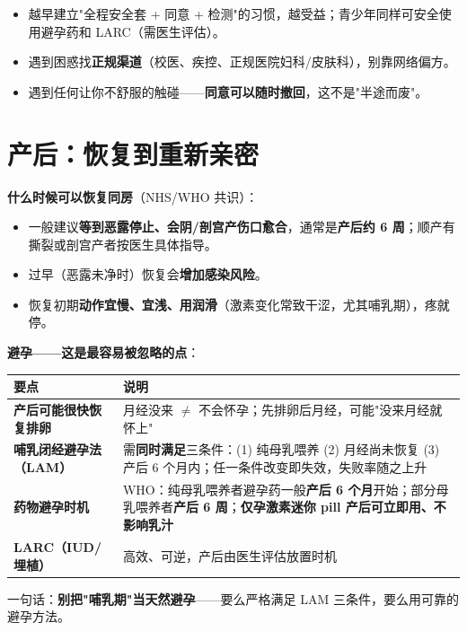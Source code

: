 \documentclass[12pt,UTF8,openany]{ctexbook}
\begin{document}
\begin{itemize}[leftmargin=2em,itemsep=0.3em]
  \item 越早建立"全程安全套 + 同意 + 检测"的习惯，越受益；青少年同样可安全使用避孕药和 LARC（需医生评估）。
  \item 遇到困惑找\textbf{正规渠道}（校医、疾控、正规医院妇科/皮肤科），别靠网络偏方。
  \item 遇到任何让你不舒服的触碰——\textbf{同意可以随时撤回}，这不是"半途而废"。
\end{itemize}

\section{产后：恢复到重新亲密}

\textbf{什么时候可以恢复同房}（NHS/WHO 共识）：

\begin{itemize}[leftmargin=2em,itemsep=0.3em]
  \item 一般建议\textbf{等到恶露停止、会阴/剖宫产伤口愈合}，通常是\textbf{产后约 6 周}；顺产有撕裂或剖宫产者按医生具体指导。
  \item 过早（恶露未净时）恢复会\textbf{增加感染风险}。
  \item 恢复初期\textbf{动作宜慢、宜浅、用润滑}（激素变化常致干涩，尤其哺乳期），疼就停。
\end{itemize}

\textbf{避孕——这是最容易被忽略的点}：

\begin{tabularx}{\linewidth}{X X}
\toprule
\textbf{要点} & \textbf{说明} \\
\midrule
\textbf{产后可能很快恢复排卵} & 月经没来 $\ne$ 不会怀孕；先排卵后月经，可能"没来月经就怀上" \\
\textbf{哺乳闭经避孕法（LAM）} & 需\textbf{同时满足}三条件：(1) 纯母乳喂养 (2) 月经尚未恢复 (3) 产后 6 个月内；任一条件改变即失效，失败率随之上升 \\
\textbf{药物避孕时机} & WHO：纯母乳喂养者避孕药一般\textbf{产后 6 个月}开始；部分母乳喂养者\textbf{产后 6 周}；\textbf{仅孕激素迷你 pill 产后可立即用、不影响乳汁} \\
\textbf{LARC（IUD/埋植）} & 高效、可逆，产后由医生评估放置时机 \\
\bottomrule
\end{tabularx}

\vspace{0.5em}
\noindent 一句话：\textbf{别把"哺乳期"当天然避孕}——要么严格满足 LAM 三条件，要么用可靠的避孕方法。
\end{document}
